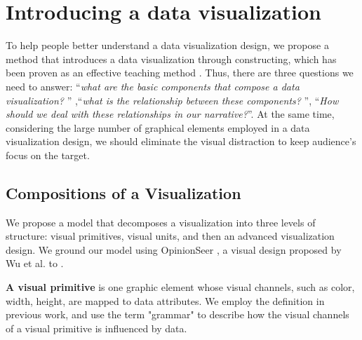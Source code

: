 \section{Introducing a data visualization} 
To help people better understand a data visualization design, we propose a method that introduces a data visualization through constructing, which has been proven as an effective teaching method\cite{huron_constructive_2014, chapman_constructive_1988} . Thus, there are three questions we need to answer: ``\textit{what are the basic components that compose a data visualization? }'' ,``\textit{what is the relationship between these components? }'', ``\textit{How should we deal with these relationships in our narrative?}''. At the same time, considering the large number of graphical elements employed in a data visualization design, we should eliminate the visual distraction to keep audience's focus on the target.

\subsection{Compositions of a Visualization}
We propose a model that decomposes a visualization into three levels of structure: visual primitives, visual units, and then an advanced visualization design. 
We ground our model using OpinionSeer \siwei{[cite]}, a visual design proposed by Wu et al. to . 

\textbf{A visual primitive} is one graphic element  whose visual channels, such as color, width, height, are mapped to data attributes. We employ the definition in previous work\cite{huron_constructive_2014, satyanarayan_vega-lite:_2017}, and use the term "grammar" to describe how the visual channels of a visual primitive is influenced by data. 

